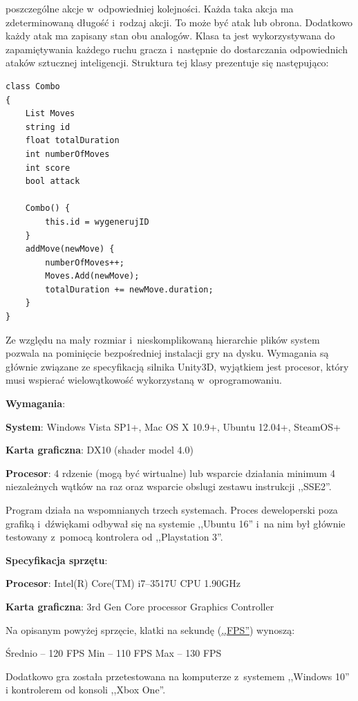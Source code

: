 \documentclass[brudnopis]{xmgr}
\begin{document}
poszczególne akcje w~odpowiedniej kolejności. Każda taka akcja ma
zdeterminowaną długość i~rodzaj
akcji. To może być atak lub obrona. Dodatkowo każdy atak ma zapisany stan
obu analogów. Klasa ta
jest wykorzystywana do zapamiętywania każdego ruchu gracza i~następnie do
dostarczania
odpowiednich ataków sztucznej inteligencji.
Struktura tej klasy prezentuje się następująco:
\begin{verbatim}
class Combo
{
	List Moves
	string id
	float totalDuration
	int numberOfMoves
	int score
	bool attack
	
	Combo() {
		this.id = wygenerujID
	}
	addMove(newMove) {
		numberOfMoves++;
		Moves.Add(newMove);
		totalDuration += newMove.duration;
	}
}
\end{verbatim}
Ze względu na mały rozmiar i~nieskomplikowaną hierarchie plików system
pozwala na pominięcie bezpośredniej instalacji gry na dysku.
Wymagania są głównie związane ze specyfikacją silnika Unity3D,
wyjątkiem jest procesor, który musi wspierać wielowątkowość wykorzystaną w~oprogramowaniu.

\textbf{Wymagania}:

\textbf{System}: Windows Vista SP1+, Mac OS X 10.9+, Ubuntu 12.04+, SteamOS+

\textbf{Karta graficzna}: DX10 (shader model 4.0)

\textbf{Procesor}: 4 rdzenie (mogą być wirtualne) lub wsparcie działania minimum
4 niezależnych wątków na raz oraz wsparcie obslugi zestawu instrukcji
 ,,SSE2''.
 
Program działa na wspomnianych trzech systemach. Proces deweloperski poza
grafiką i~dźwiękami odbywał się na systemie ,,Ubuntu 16'' i~na nim był
głównie testowany z~pomocą kontrolera od ,,Playstation 3''. 

\textbf{Specyfikacja sprzętu}:

\textbf{Procesor}: Intel(R) Core(TM) i7--3517U CPU 1.90GHz

\textbf{Karta graficzna}: 3rd Gen Core processor Graphics Controller

Na opisanym powyżej sprzęcie, klatki na sekundę (\hyperref[slownik]{,,FPS''}) wynoszą:

Średnio -- 120 FPS
Min -- 110 FPS
Max -- 130 FPS

Dodatkowo gra została przetestowana na komputerze z~systemem ,,Windows 10''
i kontrolerem od konsoli ,,Xbox One''. 
\end{document}
